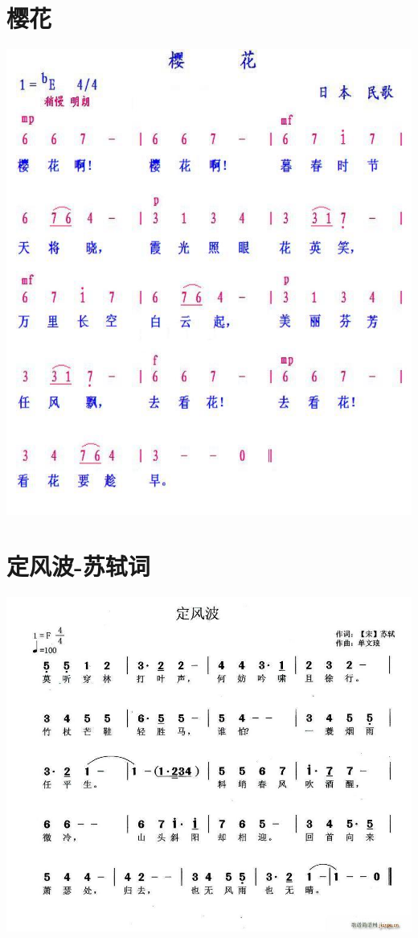 \documentclass[cn,pad,chinese]{elegantbook}
\begin{document}
\section{樱花}
	\includegraphics[width=\textwidth]{dongxiao/日本-樱花.jpg}  
\section{定风波-苏轼词}
    \includegraphics[width=\textwidth]{dongxiao/20200411-定风波.jpg}
\end{document}
